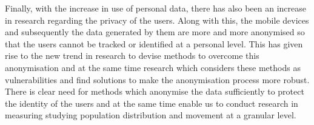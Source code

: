 Finally, with the increase in use of personal data, there has also been an increase in research regarding the privacy of the users.
Along with this, the mobile devices and subsequently the data generated by them are more and more anonymised so that the users cannot be tracked or identified at a personal level.
This has given rise to the new trend in research to devise methods to overcome this anonymisation and at the same time research which considers these methods as vulnerabilities and find solutions to make the anonymisation process more robust. 
There is clear need for methods which anonymise the data sufficiently to protect the identity of the users and at the same time enable us to conduct research in
measuring studying population distribution and movement at a granular level.

